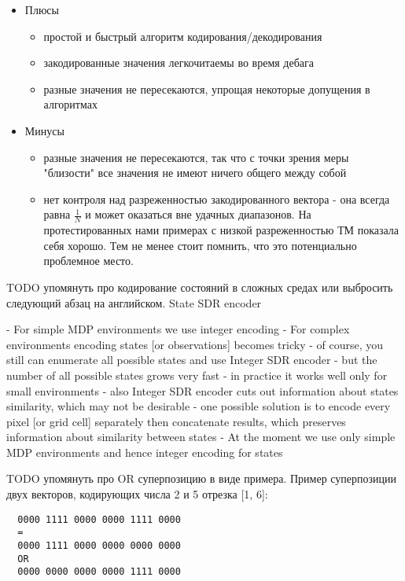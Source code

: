 \documentclass[a4paper]{article}
\begin{document}
\begin{itemize}
  \item Плюсы
  \begin{itemize}
    \item простой и быстрый алгоритм кодирования/декодирования
    \item закодированные значения легкочитаемы во время дебага
    \item разные значения не пересекаются, упрощая некоторые допущения в алгоритмах
  \end{itemize}

  \item Минусы
  \begin{itemize}
    \item разные значения не пересекаются, так что с точки зрения меры "близости" все значения не имеют ничего общего между собой
    \item нет контроля над разреженностью закодированного вектора - она всегда равна $\frac{1}{N}$ и может оказаться вне удачных диапазонов. На протестированных нами примерах с низкой разреженностью ТМ показала себя хорошо. Тем не менее стоит помнить, что это потенциально проблемное место.
  \end{itemize}
\end{itemize}

TODO упомянуть про кодирование состояний в сложных средах или выбросить следующий абзац на английском. State SDR encoder

- For simple MDP environments we use integer encoding
- For complex environments encoding states [or observations] becomes tricky
  - of course, you still can enumerate all possible states and use Integer SDR encoder
  - but the number of all possible states grows very fast
    - in practice it works well only for small environments
  - also Integer SDR encoder cuts out information about states similarity, which may not be desirable
  - one possible solution is to encode every pixel [or grid cell] separately then concatenate results, which preserves information about similarity between states
- At the moment we use only simple MDP environments and hence integer encoding for states

TODO упомянуть про OR суперпозицию в виде примера. Пример суперпозиции двух векторов, кодирующих числа 2 и 5 отрезка [1, 6]:

\begin{verbatim}
  0000 1111 0000 0000 1111 0000
  =
  0000 1111 0000 0000 0000 0000
  OR
  0000 0000 0000 0000 1111 0000
\end{verbatim}
\end{document}
